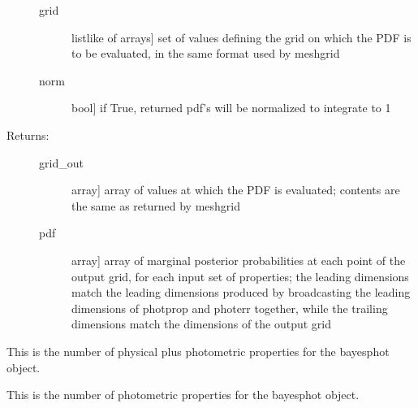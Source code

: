 \documentclass[letterpaper,10pt,english]{sphinxmanual}
\begin{document}
\begin{fulllineitems}
\begin{fulllineitems}
\begin{description}
\begin{description}
\item[{grid}] \leavevmode{[}listlike of arrays{]}
set of values defining the grid on which the PDF is to
be evaluated, in the same format used by meshgrid

\item[{norm}] \leavevmode{[}bool{]}
if True, returned pdf’s will be normalized to integrate
to 1

\end{description}

\item[{Returns:}] \leavevmode\begin{description}
\item[{grid\_out}] \leavevmode{[}array{]}
array of values at which the PDF is evaluated; contents
are the same as returned by meshgrid

\item[{pdf}] \leavevmode{[}array{]}
array of marginal posterior probabilities at each point
of the output grid, for each input set of properties; the leading
dimensions match the leading dimensions produced by
broadcasting the leading dimensions of photprop and
photerr together, while the trailing dimensions match
the dimensions of the output grid

\end{description}

\end{description}

\end{fulllineitems}


\begin{fulllineitems}
\label{\detokenize{bayesphot:slugpy.bayesphot.bp.bp.ndim}}
This is the number of physical plus photometric properties for
the bayesphot object.

\end{fulllineitems}


\begin{fulllineitems}
\label{\detokenize{bayesphot:slugpy.bayesphot.bp.bp.nphot}}
This is the number of photometric properties for the bayesphot
object.

\end{fulllineitems}



\end{fulllineitems}
\end{document}
